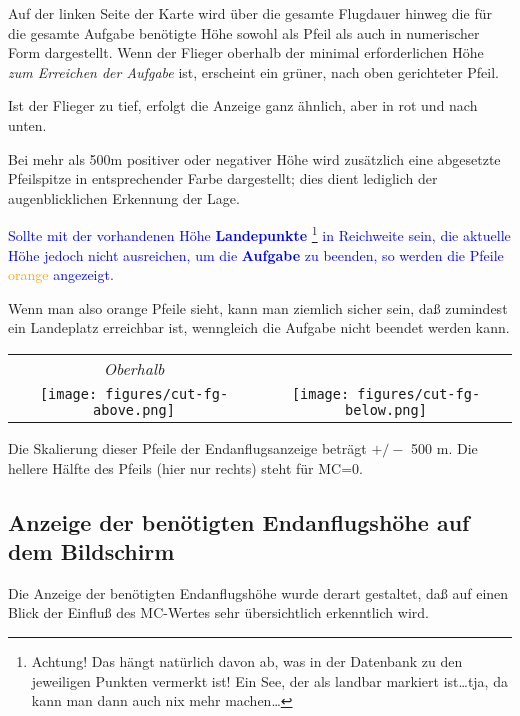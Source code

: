 Auf der linken Seite der Karte wird über die gesamte Flugdauer hinweg die für die gesamte Aufgabe benötigte
Höhe sowohl als Pfeil als auch in numerischer Form dargestellt.  Wenn der Flieger oberhalb der minimal erforderlichen Höhe \emph{zum Erreichen der Aufgabe} ist, erscheint ein grüner, nach oben gerichteter Pfeil.
 
Ist der Flieger zu tief, erfolgt die Anzeige ganz ähnlich, aber in rot und nach unten.

Bei mehr als 500m positiver oder negativer Höhe wird zusätzlich eine abgesetzte Pfeilspitze in entsprechender
Farbe dargestellt; dies dient lediglich der augenblicklichen Erkennung der Lage.

\textcolor{blue}{Sollte mit der vorhandenen Höhe \textbf{Landepunkte} \footnote{Achtung!  Das hängt natürlich  davon ab, was in der Datenbank zu den jeweiligen Punkten vermerkt ist!  Ein See, der als landbar markiert ist\dots  tja, da kann man dann auch nix mehr  machen\dots} in Reichweite sein, \achtung die aktuelle Höhe jedoch nicht ausreichen, um die \textbf{ Aufgabe} zu beenden, so werden die Pfeile \textcolor{orange}{orange} angezeigt.}

Wenn man also orange Pfeile sieht, kann man ziemlich sicher sein, daß zumindest ein Landeplatz erreichbar ist, wenngleich die Aufgabe nicht beendet werden kann. 

\begin{center}
\begin{tabular}{c c}
{\it Oberhalb}\phantom{ABC} & \phantom{ABC}{\it Unterhalb} \quad  \\
\texttt{[image: figures/cut-fg-above.png]} &
\texttt{[image: figures/cut-fg-below.png]}
\end{tabular}
\end{center}
Die Skalierung dieser Pfeile der Endanflugsanzeige beträgt $+/-$ 500 m.  
Die hellere Hälfte des Pfeils (hier nur rechts) steht für MC=0.


\subsection*{Anzeige der benötigten Endanflugshöhe auf dem Bildschirm}\label{sec:finalheight-indicator}

Die Anzeige der benötigten Endanflugshöhe wurde derart gestaltet, daß auf einen Blick der
Einfluß des MC-Wertes sehr übersichtlich erkenntlich wird.

